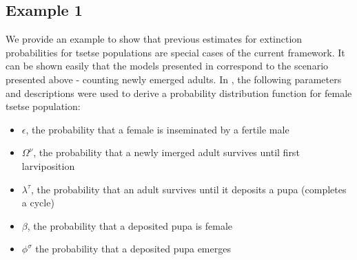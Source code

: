 \documentclass[smallextended]{svjour3}
\newcommand{\comment}[3]{\textcolor{#1}{\textbf{[#2: }\textit{#3}\textbf{]}}}
\newcommand{\jd}[1]{\comment{cyan}{JD}{#1}}
\newcommand{\eb}[1]{\comment{blue}{EB}{#1}}
\begin{document}



\subsection{Example 1}

We provide an example to show that previous estimates for extinction probabilities for tsetse populations are special cases of the current framework. It can be shown easily that the models presented in \cite{Hargrove2005a,Kajunguri2019,Are2019} correspond to the scenario presented above - counting newly emerged adults. In \cite{Are2019}, the following parameters and descriptions were used to derive a probability distribution function for female tsetse population: 
\begin{itemize}
	\item $\epsilon$, the probability that a female is inseminated by a fertile male 
	\item $\Omega^{\nu}$,  the probability that a newly imerged adult survives until first larviposition
	\item $ \lambda^{\tau}$, the probability that an adult survives until it deposits a pupa (completes a cycle)
	\item $\beta$,  the probability that a deposited pupa is female 
	\item $\phi^{\sigma}$  the probability that a deposited pupa emerges
\end{itemize}
\end{document}
